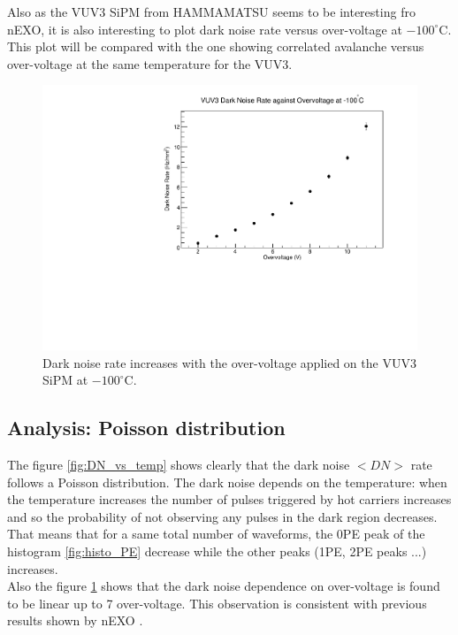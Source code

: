 \documentclass[a4paper, 11pt]{report}%
\begin{document}
  Also as the VUV3 SiPM from HAMMAMATSU seems to be interesting fro nEXO, it is also interesting to plot dark noise rate versus
  over-voltage at $-100^\circ$C. This plot will be compared with the one showing correlated avalanche versus over-voltage at the same 
  temperature for the VUV3. 
  
  \newpage
  
  \begin{figure}[!hbtp]
    \centering
    \includegraphics[totalheight=0.5\textwidth,trim=.5cm 0cm 1.8cm 1cm, clip=true]{../Pictures/VUV3_DN_vs_OV.pdf}
    \caption{Dark noise rate increases with the over-voltage applied on the VUV3 SiPM at $-100^\circ$C.}
    \label{fig:DN_vs_OV}
  \end{figure}
  
  \subsection{Analysis: Poisson distribution}
   
  The figure \ref{fig:DN_vs_temp} shows clearly that the dark noise $<DN>$ rate follows a Poisson distribution. 
  The dark noise depends on the temperature: when the temperature increases the number of pulses triggered by hot carriers increases and so 
  the probability 
  of not observing any pulses in the dark region decreases. That means that for a same total number of waveforms, the 0PE peak of 
  the histogram
  \ref{fig:histo_PE} decrease while the other peaks (1PE, 2PE peaks ...) increases. 
  \\
  
  Also the figure \ref{fig:DN_vs_OV} shows that the dark noise dependence on over-voltage is found to be linear up to 7 over-voltage.
  This observation is consistent with previous results shown by nEXO \cite{ref:lloyd_mppc}. 
\end{document}
